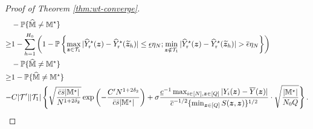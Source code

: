 \documentclass[12pt]{article}
\begin{document}
\begin{proof}[Proof of Theorem \ref{thm:wt-converge}]
\begin{align*}
        &- {\mathbb{P}}\{\widehat{{\mathbb{M}}}\neq {\mathbb{M}}^\star\}\\
        \ge & 1 - \sum_{h=1}^{H_0}\left(1 - {\mathbb{P}}\left\{\max_{{\boldsymbol{z}}\in{\mathcal{T}}_{1}}|{\widehat{Y}}^\star_{\operatorname{r}}({\boldsymbol{z}})-{\widehat{Y}}^\star_{\operatorname{r}}(\widetilde{{\boldsymbol{z}}}_h)| \le \underline{\epsilon}\eta_N;  \min_{{\boldsymbol{z}}\notin{\mathcal{T}}_{1}}|{\widehat{Y}}^\star_{\operatorname{r}}({\boldsymbol{z}})-{\widehat{Y}}^\star_{\operatorname{r}}(\widetilde{{\boldsymbol{z}}}_h)| > \overline{\epsilon}\eta_N\right\}\right) \\
        & - {\mathbb{P}}\{\widehat{{\mathbb{M}}}\neq {\mathbb{M}}^\star\}\\
        \ge & 1 - {\mathbb{P}}\{\widehat{{\mathbb{M}}}\neq {\mathbb{M}}^\star\} \\
        -&C|{\mathcal{T}}'||{\mathcal{T}}_{1}|\left\{\sqrt{\frac{\bar{c}\bar{s}|{\mathbb{M}}^\star|}{N^{1+2\delta_2}}}\exp\left(-\frac{C'N^{1+2\delta_2}}{\bar{c}\bar{s}|{\mathbb{M}}^\star|}\right)+\sigma   \frac{ \underline{c}^{-1} \max_{i\in[N],{\boldsymbol{z}}\in[Q]}|Y_i({\boldsymbol{z}})-\overline{Y}({\boldsymbol{z}})|}{ {\overline{c}^{-1/2} \{\min_{{\boldsymbol{z}}\in[Q]} S({\boldsymbol{z}},{\boldsymbol{z}})}\}^{1/2}}\cdot \sqrt{\frac{|{\mathbb{M}}^\star|}{N_0Q}}\right\}.
    \end{align*}
    \endgroup


\end{proof}
\end{document}
